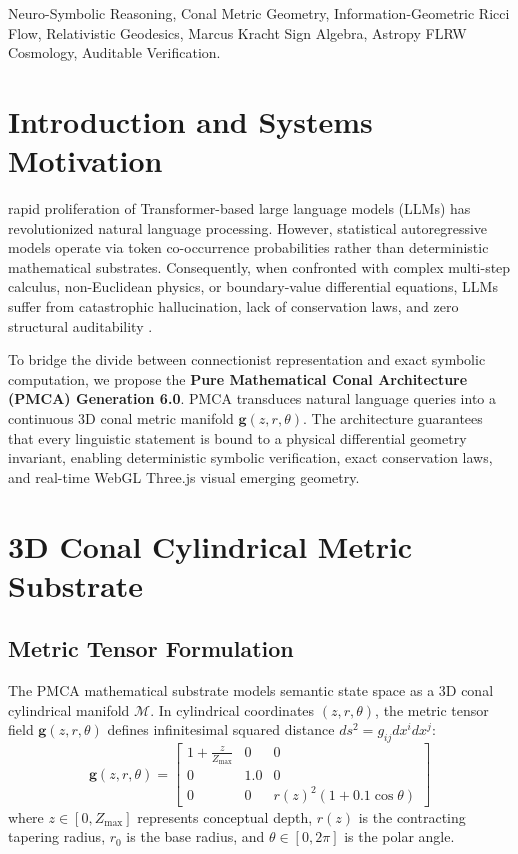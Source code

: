 \documentclass[10pt,journal,compsoc]{IEEEtran}
\begin{document}
\begin{IEEEkeywords}
Neuro-Symbolic Reasoning, Conal Metric Geometry, Information-Geometric Ricci Flow, Relativistic Geodesics, Marcus Kracht Sign Algebra, Astropy FLRW Cosmology, Auditable Verification.
\end{IEEEkeywords}

\section{Introduction and Systems Motivation}
 rapid proliferation of Transformer-based large language models (LLMs) \cite{vaswani2017attention} has revolutionized natural language processing. However, statistical autoregressive models operate via token co-occurrence probabilities rather than deterministic mathematical substrates. Consequently, when confronted with complex multi-step calculus, non-Euclidean physics, or boundary-value differential equations, LLMs suffer from catastrophic hallucination, lack of conservation laws, and zero structural auditability \cite{marcus2020next}.

To bridge the divide between connectionist representation and exact symbolic computation, we propose the \textbf{Pure Mathematical Conal Architecture (PMCA) Generation 6.0}. PMCA transduces natural language queries into a continuous 3D conal metric manifold $\mathbf{g}(z, r, \theta)$. The architecture guarantees that every linguistic statement is bound to a physical differential geometry invariant, enabling deterministic symbolic verification, exact conservation laws, and real-time WebGL Three.js visual emerging geometry.

\section{3D Conal Cylindrical Metric Substrate}
\subsection{Metric Tensor Formulation}
The PMCA mathematical substrate models semantic state space as a 3D conal cylindrical manifold $\mathcal{M}$. In cylindrical coordinates $(z, r, \theta)$, the metric tensor field $\mathbf{g}(z, r, \theta)$ defines infinitesimal squared distance $ds^2 = g_{ij} dx^i dx^j$:
\begin{equation}
\mathbf{g}(z, r, \theta) = \begin{bmatrix} 1 + \frac{z}{Z_{\text{max}}} & 0 & 0 \\ 0 & 1.0 & 0 \\ 0 & 0 & r(z)^2 (1 + 0.1 \cos\theta) \end{bmatrix}
\end{equation}
where $z \in [0, Z_{\text{max}}]$ represents conceptual depth, $r(z)$ is the contracting tapering radius, $r_0$ is the base radius, and $\theta \in [0, 2\pi]$ is the polar angle.
\end{document}
